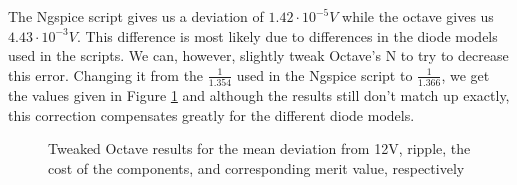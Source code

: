 \pagebreak
The Ngspice script gives us a deviation of $1.42\cdot 10^{-5}V$ while the octave gives us $4.43 \cdot 10^{-3}V$. This difference is most likely due to differences in the diode models used in the scripts. We can, however, slightly tweak Octave's N to try to decrease this error. Changing it from the $\frac{1}{1.354}$ used in the Ngspice script to $\frac{1}{1.366}$, we get the values given in Figure \ref{fig:tweak_out} and although the results still don't match up exactly, this correction compensates greatly for the different diode models.

\begin{figure}[h]
	\centering
	\scalebox{1.2}{
		
	}
	\caption{Tweaked Octave results for the mean deviation from 12V, ripple, the cost of the components, and corresponding merit value, respectively}
	\label{fig:tweak_out}
\end{figure}
